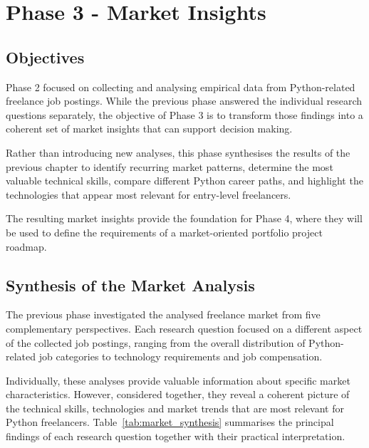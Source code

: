 
\chapter{Phase 3 - Market Insights}

\section{Objectives}

Phase 2 focused on collecting and analysing empirical data from Python-related freelance job postings. While the previous phase answered the individual
research questions separately, the objective of Phase 3 is to transform those findings into a coherent set of market insights that can support decision making.

Rather than introducing new analyses, this phase synthesises the results of the previous chapter to identify recurring market patterns, determine the most
valuable technical skills, compare different Python career paths, and highlight the technologies that appear most relevant for entry-level freelancers.

The resulting market insights provide the foundation for Phase 4, where they will be used to define the requirements of a market-oriented
portfolio project roadmap.

\section{Synthesis of the Market Analysis}

The previous phase investigated the analysed freelance market from five complementary perspectives. Each research question focused on a different
aspect of the collected job postings, ranging from the overall distribution of Python-related job categories to technology requirements and job compensation.

Individually, these analyses provide valuable information about specific market characteristics. However, considered together, they reveal a coherent
picture of the technical skills, technologies and market trends that are most relevant for Python freelancers. Table~\ref{tab:market_synthesis} summarises
the principal findings of each research question together with their practical interpretation.


